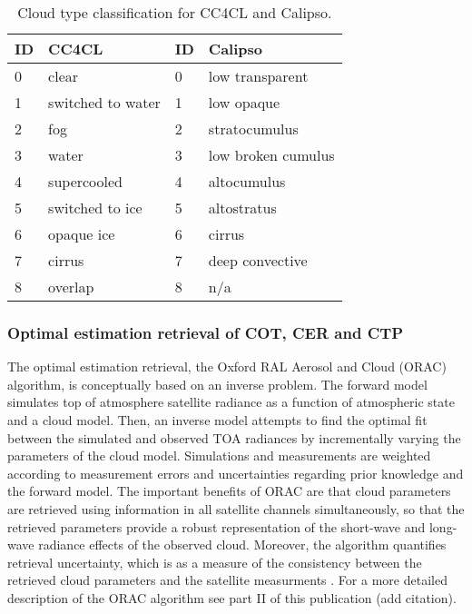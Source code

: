 \begin{table}[h]
  \caption{Cloud type classification for CC4CL and Calipso.}
  \begin{tabular}{l|l||l|l}
    \hline
    ID & CC4CL & ID & Calipso \\
    \hline
    0 & clear & 0 & low transparent \\
    1 & switched to water & 1 & low opaque \\
    2 & fog & 2 & stratocumulus \\
    3 & water & 3 & low broken cumulus \\
    4 & supercooled & 4 & altocumulus \\
    5 & switched to ice & 5 & altostratus \\
    6 & opaque ice & 6 & cirrus \\
    7 & cirrus & 7& deep convective \\
    8 & overlap & 8 & n/a \\
    \hline
  \end{tabular}
  \label{tab:cloud_types}
\end{table}
\subsubsection{Optimal estimation retrieval of COT, CER and CTP}
The optimal estimation retrieval, the Oxford RAL Aerosol and Cloud (ORAC) algorithm, is conceptually based on an inverse problem. The forward model simulates top of atmosphere satellite radiance as a function of atmospheric state and a cloud model. Then, an inverse model attempts to find the optimal fit between the simulated and observed TOA radiances by incrementally varying the parameters of the cloud model. Simulations and measurements are weighted according to measurement errors and uncertainties regarding prior knowledge and the forward model. The important benefits of ORAC are that cloud parameters are retrieved using information in all satellite channels simultaneously, so that the retrieved parameters provide a robust representation of the short-wave and long-wave radiance effects of the observed cloud. Moreover, the algorithm quantifies retrieval uncertainty, which is as a measure of the consistency between the retrieved cloud parameters and the satellite measurments \citep{Poulsen12}. For a more detailed description of the ORAC algorithm see part II of this publication (add citation).

